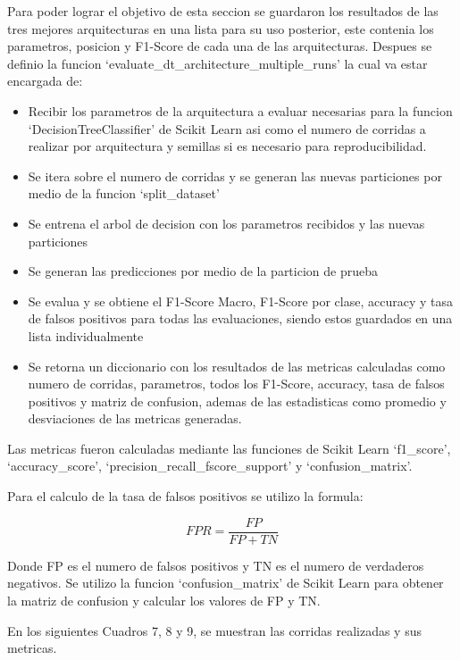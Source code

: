\documentclass[12pt,a4paper]{article}
\begin{document}
Para poder lograr el objetivo de esta seccion se guardaron los resultados de las tres mejores arquitecturas
en una lista para su uso posterior, este contenia los parametros, posicion y F1-Score de cada una de las arquitecturas.
Despues se definio la funcion `evaluate_dt_architecture_multiple_runs' la cual va estar encargada de:

\begin{itemize}
  \item Recibir los parametros de la arquitectura a evaluar necesarias para la funcion `DecisionTreeClassifier' de Scikit Learn
    asi como el numero de corridas a realizar por arquitectura y semillas si es necesario para reproducibilidad.
  \item Se itera sobre el numero de corridas y se generan las nuevas particiones por medio de la funcion `split_dataset'
  \item Se entrena el arbol de decision con los parametros recibidos y las nuevas particiones
  \item Se generan las predicciones por medio de la particion de prueba
  \item Se evalua y se obtiene el F1-Score Macro, F1-Score por clase, accuracy y
    tasa de falsos positivos para todas las evaluaciones, siendo estos
    guardados en una lista individualmente
  \item Se retorna un diccionario con los resultados de las metricas calculadas como
    numero de corridas, parametros, todos los F1-Score, accuracy, tasa de falsos positivos y matriz de confusion,
    ademas de las estadisticas como promedio y desviaciones de las metricas generadas.
\end{itemize}

Las metricas fueron calculadas mediante las funciones de Scikit Learn `f1_score', `accuracy_score', `precision_recall_fscore_support' y `confusion_matrix'.

Para el calculo de la tasa de falsos positivos se utilizo la formula:

\begin{equation}
  FPR = \frac{FP}{FP + TN}
\end{equation}

Donde FP es el numero de falsos positivos y TN es el numero de verdaderos negativos.
Se utilizo la funcion `confusion_matrix' de Scikit Learn para obtener
la matriz de confusion y calcular los valores de FP y TN.

En los siguientes Cuadros 7, 8 y 9, se muestran las corridas realizadas y sus metricas.
\end{document}

